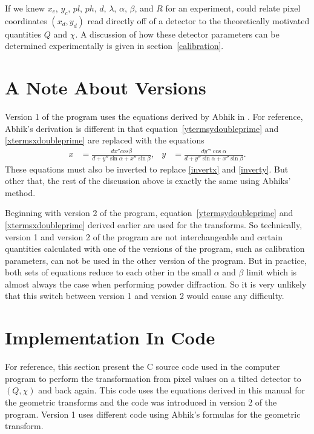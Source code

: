 If we knew $x_c$, $y_c$, $pl$, $ph$, $d$, $\lambda$,
$\alpha$, $\beta$, and $R$ for an experiment, could
relate pixel coordinates $(x_d,y_d)$ read directly off
of a detector to the
theoretically motivated quantities $Q$ and $\chi$.
A discussion of how these detector parameters can be 
determined experimentally
is given in section~\ref{calibration}.

\section{A Note About Versions}\label{note_about_versions}

Version 1 of the program uses the equations derived
by Abhik in \cite{Kumar05}. For reference, Abhik's 
derivation is different in that 
equation~\ref{ytermsydoubleprime} and \ref{xtermsxdoubleprime} 
are replaced with the equations
\begin{align}
    x &= \frac{dx''cos\beta}{d+y''\sin\alpha+x''\sin\beta}, &
    y &= \frac{dy'''\cos\alpha}{d+y''\sin\alpha+x''\sin\beta}.
\end{align}
These equations must also be inverted to replace \ref{invertx}
and \ref{inverty}. But other that,
the rest of the discussion above is exactly the same using Abhiks' 
method.

Beginning with version 2 of the program, 
equation~\ref{ytermsydoubleprime} and \ref{xtermsxdoubleprime}
derived earlier are used for the transforms.
So technically, version 1 and version 2 of the program are not
interchangeable and certain quantities calculated with one of
the versions of the program, such as calibration parameters,
can not be used in the other version of the program.
But in practice, both sets of equations reduce to each other in the 
small $\alpha$ and $\beta$ limit which is almost always the case when
performing powder diffraction. So it is very unlikely that this
switch between version 1 and version 2 would cause any difficulty.


\section{Implementation In Code}

For reference, this section present the C source 
code used in the computer program to perform the 
transformation from pixel values on a tilted 
detector to $(Q,\chi)$ and back again. 
This code uses the equations derived in this manual
for the geometric transforms and the code was introduced 
in version 2 of the program. Version 1 uses different
code using Abhik's formulas for the geometric transform.

